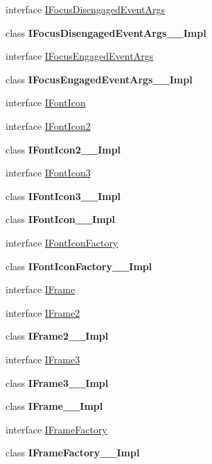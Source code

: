 \begin{DoxyCompactItemize}
\item 
interface \hyperlink{interface_windows_1_1_u_i_1_1_xaml_1_1_controls_1_1_i_focus_disengaged_event_args}{I\+Focus\+Disengaged\+Event\+Args}
\item 
class {\bfseries I\+Focus\+Disengaged\+Event\+Args\+\_\+\+\_\+\+Impl}
\item 
interface \hyperlink{interface_windows_1_1_u_i_1_1_xaml_1_1_controls_1_1_i_focus_engaged_event_args}{I\+Focus\+Engaged\+Event\+Args}
\item 
class {\bfseries I\+Focus\+Engaged\+Event\+Args\+\_\+\+\_\+\+Impl}
\item 
interface \hyperlink{interface_windows_1_1_u_i_1_1_xaml_1_1_controls_1_1_i_font_icon}{I\+Font\+Icon}
\item 
interface \hyperlink{interface_windows_1_1_u_i_1_1_xaml_1_1_controls_1_1_i_font_icon2}{I\+Font\+Icon2}
\item 
class {\bfseries I\+Font\+Icon2\+\_\+\+\_\+\+Impl}
\item 
interface \hyperlink{interface_windows_1_1_u_i_1_1_xaml_1_1_controls_1_1_i_font_icon3}{I\+Font\+Icon3}
\item 
class {\bfseries I\+Font\+Icon3\+\_\+\+\_\+\+Impl}
\item 
class {\bfseries I\+Font\+Icon\+\_\+\+\_\+\+Impl}
\item 
interface \hyperlink{interface_windows_1_1_u_i_1_1_xaml_1_1_controls_1_1_i_font_icon_factory}{I\+Font\+Icon\+Factory}
\item 
class {\bfseries I\+Font\+Icon\+Factory\+\_\+\+\_\+\+Impl}
\item 
interface \hyperlink{interface_windows_1_1_u_i_1_1_xaml_1_1_controls_1_1_i_frame}{I\+Frame}
\item 
interface \hyperlink{interface_windows_1_1_u_i_1_1_xaml_1_1_controls_1_1_i_frame2}{I\+Frame2}
\item 
class {\bfseries I\+Frame2\+\_\+\+\_\+\+Impl}
\item 
interface \hyperlink{interface_windows_1_1_u_i_1_1_xaml_1_1_controls_1_1_i_frame3}{I\+Frame3}
\item 
class {\bfseries I\+Frame3\+\_\+\+\_\+\+Impl}
\item 
class {\bfseries I\+Frame\+\_\+\+\_\+\+Impl}
\item 
interface \hyperlink{interface_windows_1_1_u_i_1_1_xaml_1_1_controls_1_1_i_frame_factory}{I\+Frame\+Factory}
\item 
class {\bfseries I\+Frame\+Factory\+\_\+\+\_\+\+Impl}
\item 

\end{DoxyCompactItemize}
